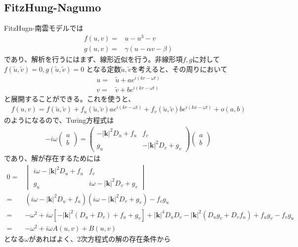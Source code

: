 \documentclass{jsarticle}
\newcommand{\abs}[1]{{\left| #1 \right|}}
\newcommand{\skakko}[1]{{\left(#1\right)}}                  %
\newcommand{\mkakko}[1]{{\left[#1\right]}}                  %
\theoremstyle{definition}
\begin{document}
\subsection{FitzHung-Nagumo}\label{FitzHung-Nagumo}
FitzHugn-南雲モデルでは
\begin{align*}
    f(u,v)=&u-u^3-v\\
    g(u,v)=&\gamma\skakko{u-\alpha v-\beta }
\end{align*}
であり、解析を行うにはまず、線形近似を行う。非線形項$f,g$に対して$f\skakko{\tilde{u},\tilde{v}}=0,g\skakko{\tilde{u},\tilde{v}}=0$
となる定数$\tilde{u},\tilde{v}$を考えると、その周りにおいて
\begin{align*}
    u=&\tilde{u}+ae^{i\skakko{kr-\omega t}}\\
    v=&\tilde{v}+be^{i\skakko{kr-\omega t}}
\end{align*}
と展開することができる。これを使うと、
\begin{align}
    f\skakko{u,v}=f\skakko{\tilde{u},\tilde{v}}+f_u\skakko{\tilde{u},\tilde{v}}ae^{i\skakko{kr-\omega t}}+f_v\skakko{\tilde{u},\tilde{v}}be^{i\skakko{kx-\omega t}}+o(a,b)
\end{align}
のようになるので、Turing方程式は
\begin{align}
    -i\omega
    \begin{pmatrix}
        a\\
        b
    \end{pmatrix}
    =
    \begin{pmatrix}
        -\abs{\mathbf{k}}^2D_u+f_u     &   f_v         \\
        g_u             &   -\abs{\mathbf{k}}^2D_v+g_v 
    \end{pmatrix}
    \begin{pmatrix}
        a\\
        b
    \end{pmatrix}
\end{align}
であり、解が存在するためには
\begin{align*}
    0
    =&
    \begin{vmatrix}
        i\omega-\abs{\mathbf{k}}^2D_u+f_u     &   f_v         \\
        g_u             &   i\omega-\abs{\mathbf{k}}^2D_v+g_v 
    \end{vmatrix}\\
    =&\skakko{i\omega-\abs{\mathbf{k}}^2D_u+f_u}\skakko{i\omega-\abs{\mathbf{k}}^2D_v+g_v}-f_vg_u\\
    =&-\omega^2+i\omega\mkakko{-\abs{\mathbf{k}}^2\skakko{D_u+D_v}+f_u+g_v}+\abs{\mathbf{k}}^4D_uD_v-\abs{\mathbf{k}}^2\skakko{D_ug_v+D_vf_u}+f_ug_v-f_vg_u\\
    =&-\omega^2+i\omega A\skakko{u,v}+B\skakko{u,v}
\end{align*}
となる$\omega$があればよく、2次方程式の解の存在条件から
\end{document}
